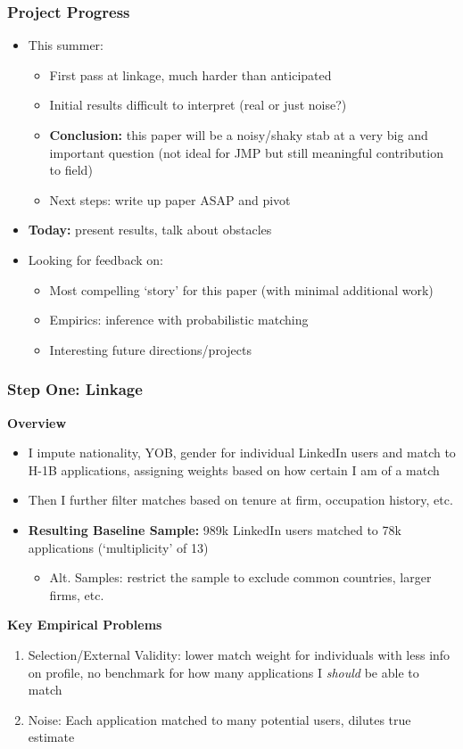 \documentclass[xcolor=dvipsnames, compress, 12pt, aspectratio=169, handout]{beamer}
\begin{document}
\begin{frame}
    \frametitle{Project Progress}
    \begin{itemize}
        \item This summer: 
        \begin{itemize}
            \item First pass at linkage, much harder than anticipated 
            \item Initial results difficult to interpret (real or just noise?)
            \item \textbf{Conclusion:} this paper will be a noisy/shaky stab at a very big and important question (not ideal for JMP but still meaningful contribution to field)
            \item Next steps: write up paper ASAP and pivot
        \end{itemize}
        \item \textbf{Today:} present results, talk about obstacles
        \item Looking for feedback on:
        \begin{itemize}
            \item Most compelling `story' for this paper (with minimal additional work)
            \item Empirics: inference with probabilistic matching 
            \item Interesting future directions/projects 
        \end{itemize}
    \end{itemize}
\end{frame}

\begin{frame}
    \frametitle{Step One: Linkage}
    \textbf{Overview}
    \begin{itemize}
        \item I impute nationality, YOB, gender for individual LinkedIn users and match to H-1B applications, assigning weights based on how certain I am of a match
        \item Then I further filter matches based on tenure at firm, occupation history, etc.
        \item \textbf{Resulting Baseline Sample:} 989k LinkedIn users matched to 78k applications (`multiplicity' of 13)
        \begin{itemize}
            \item Alt. Samples: restrict the sample to exclude common countries, larger firms, etc.
        \end{itemize}
    \end{itemize}
    \vspace{2mm}
    \textbf{Key Empirical Problems}
    \begin{enumerate}
        \item Selection/External Validity: lower match weight for individuals with less info on profile, no benchmark for how many applications I \textit{should} be able to match
        \item Noise: Each application matched to many potential users, dilutes true estimate
    \end{enumerate}
\end{frame}
\end{document}
